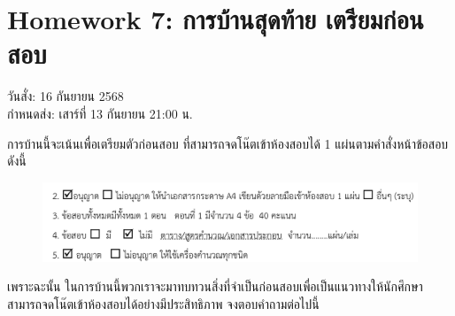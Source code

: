 \newpage
\section*{Homework 7: การบ้านสุดท้าย เตรียมก่อนสอบ}
วันสั่ง: 16 กันยายน 2568\\
กำหนดส่ง: เสาร์ที่ 13 กันยายน 21:00 น.

การบ้านนี้จะเน้นเพื่อเตรียมตัวก่อนสอบ ที่สามารถจดโน๊ตเข้าห้องสอบได้ 1 แผ่นตามคำสั่งหน้าข้อสอบดังนี้
\begin{figure}[h]
	\centering
	\includegraphics[width=0.7\linewidth]{instruction-final}
\end{figure}

เพราะฉะนั้น ในการบ้านนี้พวกเราจะมาทบทวนสิ่งที่จำเป็นก่อนสอบเพื่อเป็นแนวทางให้นักศึกษาสามารถจดโน๊ตเข้าห้องสอบได้อย่างมีประสิทธิภาพ จงตอบคำถามต่อไปนี้

